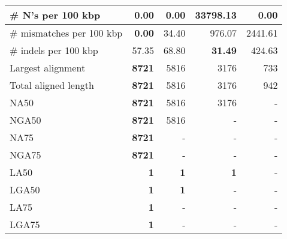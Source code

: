 \documentclass[12pt,a4paper]{article}
\begin{document}
\begin{table}[ht]
\begin{center}
\begin{tabular}{|l*{4}{|r}|}
\# N's per 100 kbp & {\bf 0.00} & {\bf 0.00} & 33798.13 & {\bf 0.00} \\ \hline
\# mismatches per 100 kbp & {\bf 0.00} & 34.40 & 976.07 & 2441.61 \\ \hline
\# indels per 100 kbp & 57.35 & 68.80 & {\bf 31.49} & 424.63 \\ \hline
Largest alignment & {\bf 8721} & 5816 & 3176 & 733 \\ \hline
Total aligned length & {\bf 8721} & 5816 & 3176 & 942 \\ \hline
NA50 & {\bf 8721} & 5816 & 3176 & - \\ \hline
NGA50 & {\bf 8721} & 5816 & - & - \\ \hline
NA75 & {\bf 8721} & - & - & - \\ \hline
NGA75 & {\bf 8721} & - & - & - \\ \hline
LA50 & {\bf 1} & {\bf 1} & {\bf 1} & - \\ \hline
LGA50 & {\bf 1} & {\bf 1} & - & - \\ \hline
LA75 & {\bf 1} & - & - & - \\ \hline
LGA75 & {\bf 1} & - & - & - \\ \hline
\end{tabular}
\end{center}
\end{table}
\end{document}
